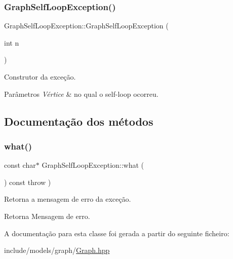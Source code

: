 \subsubsection{\texorpdfstring{Graph\+Self\+Loop\+Exception()}{GraphSelfLoopException()}}
{\footnotesize\ttfamily Graph\+Self\+Loop\+Exception\+::\+Graph\+Self\+Loop\+Exception (\begin{DoxyParamCaption}\item[{int}]{n }\end{DoxyParamCaption})\hspace{0.3cm}{\ttfamily [inline]}}

Construtor da exceção. 
\begin{DoxyParams}{Parâmetros}
{\em Vértice} & no qual o self-\/loop ocorreu. \\
\hline
\end{DoxyParams}


\subsection{Documentação dos métodos}
\mbox{\label{classGraphSelfLoopException_ae608d642082d2183111b8a43a1bfa64f}} 
\subsubsection{\texorpdfstring{what()}{what()}}
{\footnotesize\ttfamily const char$\ast$ Graph\+Self\+Loop\+Exception\+::what (\begin{DoxyParamCaption}{ }\end{DoxyParamCaption}) const throw  ) \hspace{0.3cm}{\ttfamily [inline]}}

Retorna a mensagem de erro da exceção. \begin{DoxyReturn}{Retorna}
Mensagem de erro. 
\end{DoxyReturn}


A documentação para esta classe foi gerada a partir do seguinte ficheiro\+:\begin{DoxyCompactItemize}
\item 
include/models/graph/\hyperlink{Graph_8hpp}{Graph.\+hpp}\end{DoxyCompactItemize}

